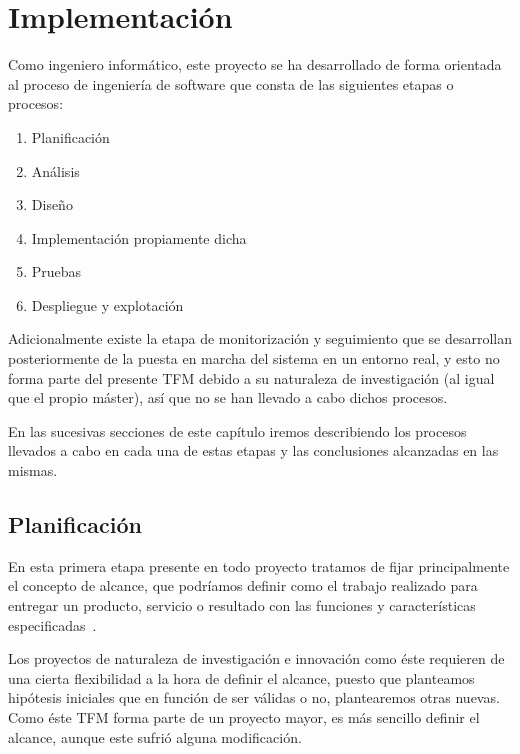 \graphicspath{{capitulos/Capitulo4-Implementacion/recursos/}}

\section{Implementación} \label{capitulo:4}

Como ingeniero informático, este proyecto se ha desarrollado de forma orientada al proceso de ingeniería de software que consta de las siguientes etapas o procesos: 
\begin{enumerate}
    \item Planificación
    \item Análisis
    \item Diseño
    \item Implementación propiamente dicha
    \item Pruebas
    \item Despliegue y explotación    
\end{enumerate}
Adicionalmente existe la etapa de monitorización y seguimiento que se desarrollan posteriormente de la puesta en marcha del sistema en un entorno real, y esto no forma parte del presente TFM debido a su naturaleza de investigación (al igual que el propio máster), así que no se han llevado a cabo dichos procesos.

En las sucesivas secciones de este capítulo iremos describiendo los procesos llevados a cabo en cada una de estas etapas y las conclusiones alcanzadas en las mismas.

\subsection{Planificación}
\label{sec:4:planificacion}
En esta primera etapa presente en todo proyecto tratamos de fijar principalmente el concepto de alcance, que podríamos definir como el trabajo realizado para entregar un producto, servicio o resultado con
las funciones y características especificadas~\cite{PMBOK}.

Los proyectos de naturaleza de investigación e innovación como éste requieren de una cierta flexibilidad a la hora de definir el alcance, puesto que planteamos hipótesis iniciales que en función de ser válidas o no, plantearemos otras nuevas. Como éste TFM forma parte de un proyecto mayor, es más sencillo definir el alcance, aunque este sufrió alguna modificación.

